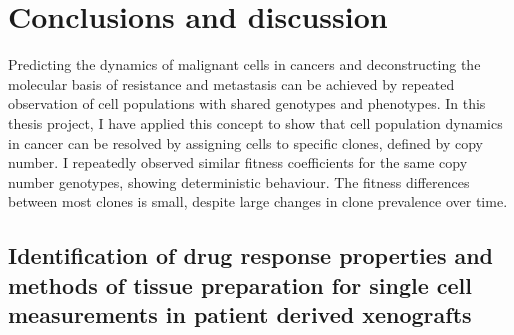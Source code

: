 
{\chapter{Conclusions and discussion}

}
\label{ch:Chapter6}

Predicting the dynamics of malignant cells in cancers and deconstructing the molecular basis of resistance and metastasis can be achieved by repeated observation of cell populations with shared genotypes and phenotypes. In this thesis project, I have applied this concept to show that cell population dynamics in cancer can be resolved by assigning cells to specific clones, defined by copy number. I repeatedly observed similar fitness coefficients for the same copy number genotypes, showing deterministic behaviour. The fitness differences between most clones is small, despite large changes in clone prevalence over time.


\section{Identification of drug response properties and methods of tissue preparation for single cell measurements in patient derived xenografts}

